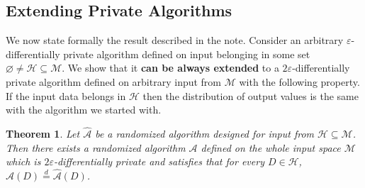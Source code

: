\documentclass[12pt,a4paper]{article}
\newtheorem{theorem}{Theorem}[section]
\numberwithin{equation}{section}
\numberwithin{equation}{section}
\renewcommand{\epsilon}{\varepsilon}
\newcommand{\1}{{\text{\Large $\mathfrak 1$}}}
\renewcommand{\emptyset}{\varnothing}
\newcommand{\2}[1]{{\text{\Large $\mathfrak 1$}\!\left(#1\right)}}
\begin{document}
\subsection*{Extending Private Algorithms}



We now state formally the result described in the note. Consider an arbitrary $\epsilon$-differentially private algorithm defined on input belonging in some set $\emptyset \not  = \mathcal{H} \subseteq \mathcal{M}.$ We show that it \textbf{can be always extended} to a $2\epsilon$-differentially private algorithm defined on arbitrary input from $\mathcal{M}$ with the following property. If the input data belongs in $\mathcal{H}$ then the distribution of output values is the same with the algorithm we started with.  

\begin{theorem}\label{extension}
Let $\hat{\mathcal{A}}$ be a randomized algorithm designed for input from $\mathcal{H} \subseteq \mathcal{M}$. Then there exists a randomized algorithm $\mathcal{A}$ defined on the whole input space $\mathcal{M}$ which is $2\epsilon$-differentially private and satisfies that for every $D \in \mathcal{H}$, $\mathcal{A}(D) \overset{d}{=}  \hat{\mathcal{A}}(D)$.
\end{theorem}
\end{document}
